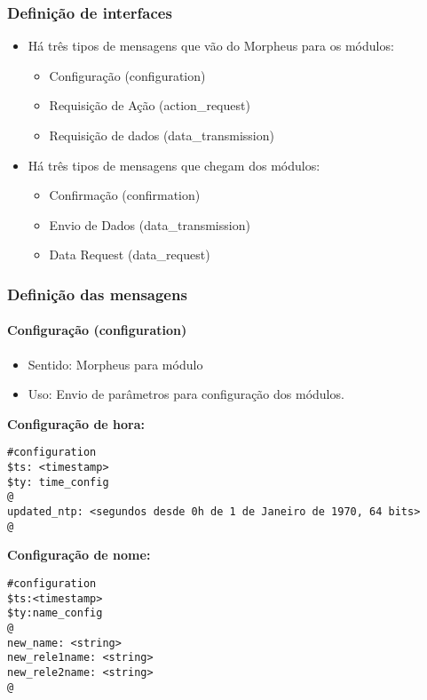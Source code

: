 \subsubsection{Definição de interfaces}
\begin{itemize}
\item Há três tipos de mensagens que vão do Morpheus para os módulos:
  \begin{itemize}
  \item Configuração (configuration)
  \item Requisição de Ação (action\_request)
  \item Requisição de dados (data\_transmission)
  \end{itemize}
\item Há três tipos de mensagens que chegam dos módulos:
  \begin{itemize}
  \item Confirmação (confirmation)
  \item Envio de Dados (data\_transmission)
  \item Data Request (data\_request)
  \end{itemize}
\end{itemize}

\subsubsection{Definição das mensagens}

\paragraph{Configuração (configuration)}
\begin{itemize}
\item Sentido: Morpheus para módulo
\item Uso: Envio de parâmetros para configuração dos módulos.
\end{itemize}

\textbf{Configuração de hora:}
\begin{lstlisting}
#configuration
$ts: <timestamp>
$ty: time_config
@
updated_ntp: <segundos desde 0h de 1 de Janeiro de 1970, 64 bits>
@
\end{lstlisting}

\textbf{Configuração de nome:}
\begin{lstlisting}
#configuration
$ts:<timestamp>
$ty:name_config
@
new_name: <string>
new_rele1name: <string>
new_rele2name: <string>
@
\end{lstlisting}


